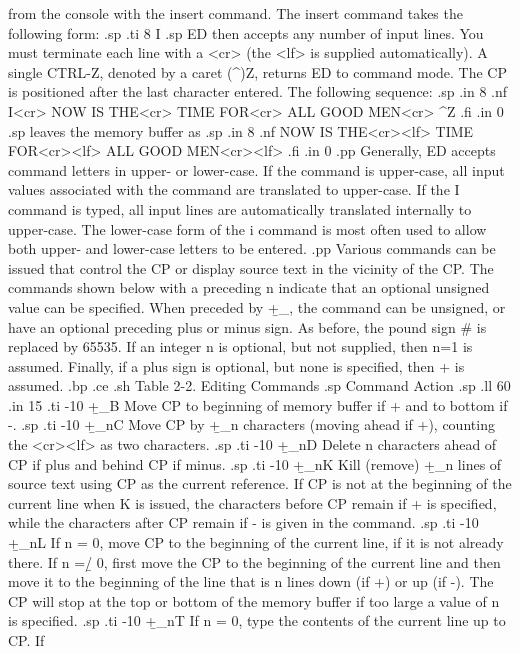 from the console with the insert command.  The insert command takes the 
following form:
.sp
.ti 8
I
.sp
ED then accepts any number of input lines.  You must terminate each line with 
a <cr> (the <lf> is supplied automatically).  A single CTRL-Z, denoted 
by a caret (^)Z, returns ED to command mode.  The CP is positioned after the 
last character entered.  The following sequence:
.sp
.in 8
.nf
I<cr>
NOW IS THE<cr>
TIME FOR<cr>
ALL GOOD MEN<cr>
^Z
.fi
.in 0
.sp
leaves the memory buffer as
.sp
.in 8
.nf
NOW IS THE<cr><lf>
TIME FOR<cr><lf>
ALL GOOD MEN<cr><lf>
.fi
.in 0
.pp
Generally, ED accepts command letters in upper- or lower-case.  If the 
command is upper-case, all input values associated with the command are 
translated to upper-case.  If the I command is typed, all 
input lines are automatically translated internally to upper-case.  The 
lower-case form of the i command is most often used to allow both upper- and 
lower-case letters to be entered.
.pp
Various commands can be issued that control the CP or display source text 
in the vicinity of the CP.  The commands shown below with a preceding n 
indicate that an optional unsigned value can be specified.  When preceded 
by +\b_, the command can be unsigned, or have an optional preceding plus or 
minus sign.  As before, the pound sign # is replaced by 65535.  If an 
integer n is optional, but not supplied, then n=1 is assumed.  Finally, if a 
plus sign is optional, but none is specified, then + is assumed.
.bp 
.ce
.sh
Table 2-2.  Editing Commands
.sp
   Command                       Action
.sp
.ll 60
.in 15
.ti -10
+\b_B        Move CP to beginning of memory buffer if + and to bottom if -.
.sp
.ti -10
+\b_nC       Move CP by +\b_n characters (moving ahead if +), counting the 
<cr><lf> as two characters.
.sp
.ti -10
+\b_nD       Delete n characters ahead of CP if plus and behind CP if minus.
.sp
.ti -10
+\b_nK       Kill (remove) +\b_n lines of source text using CP as the 
current reference.  If CP is not at the beginning of the current line when K 
is issued, the characters before CP remain if + is specified, while the 
characters after CP remain if - is given in the command.
.sp
.ti -10
+\b_nL       If n = 0, move CP to the beginning of the current 
line, if it is 
not already there.  If n =\b/ 0, first move the CP to the beginning of the 
current line and then move it to the beginning of the line that is n lines 
down (if +) or up (if -).  The CP will stop at the top or bottom of the 
memory buffer if too large a value of n is specified.
.sp
.ti -10
+\b_nT       If n = 0, type the contents of the current line up to CP.  If 
